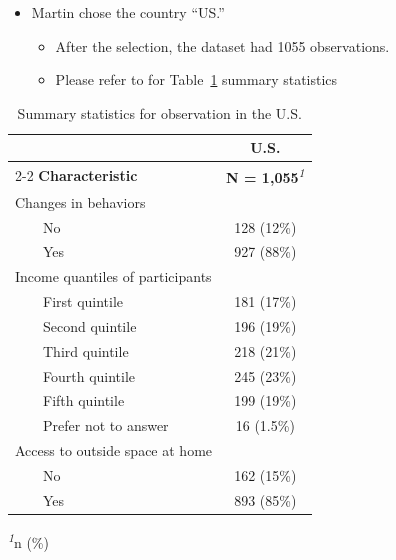 \documentclass[
  letterpaper,
  DIV=11,
  numbers=noendperiod]{scrartcl}
\providecommand{\tightlist}{%
  \setlength{\itemsep}{0pt}\setlength{\parskip}{0pt}}
\begin{document}
\begin{itemize}
\tightlist
\item
  Martin chose the country ``US.''

  \begin{itemize}
  \tightlist
  \item
    After the selection, the dataset had 1055 observations.
  \item
    Please refer to for Table~\ref{tbl-of-us-summary} summary statistics
  \end{itemize}
\end{itemize}

\begingroup
\fontsize{12.0pt}{14.0pt}\selectfont
\setlength{\LTpost}{0mm}

\begin{longtable}{lc}

\caption{\label{tbl-of-us-summary}Summary statistics for observation in
the U.S.}

\tabularnewline

\toprule
 & \multicolumn{1}{c}{{U.S.}} \\ 
\cmidrule(lr){2-2}
\textbf{Characteristic} & \textbf{N = 1,055}\textsuperscript{\textit{1}} \\ 
\midrule\endhead\addlinespace[2.5pt]
Changes in behaviors &  \\ 
    No & 128 (12\%) \\ 
    Yes & 927 (88\%) \\ 
Income quantiles of participants &  \\ 
    First quintile & 181 (17\%) \\ 
    Second quintile & 196 (19\%) \\ 
    Third quintile & 218 (21\%) \\ 
    Fourth quintile & 245 (23\%) \\ 
    Fifth quintile & 199 (19\%) \\ 
    Prefer not to answer & 16 (1.5\%) \\ 
Access to outside space at home &  \\ 
    No & 162 (15\%) \\ 
    Yes & 893 (85\%) \\ 
\bottomrule

\end{longtable}

\begin{minipage}{\linewidth}
\vspace{.05em}
\textsuperscript{\textit{1}}n (\%)\\
\end{minipage}
\endgroup
\end{document}
